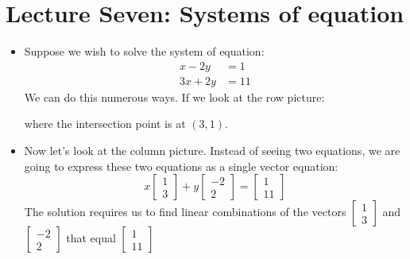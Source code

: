 \section{Lecture Seven: Systems of equation}
\begin{itemize}
    \item Suppose we wish to solve the system of equation:
    \begin{align}
        x-2y&=1 \\ 
        3x+2y &= 11
    \end{align}
    We can do this numerous ways. If we look at the row picture:
    \begin{center}
    \end{center}
    where the intersection point is at $(3,1)$.
    \item Now let's look at the column picture. Instead of seeing two equations, we are going to express these two equations as a single vector equation:
    \begin{equation}
        x\begin{bmatrix}
            1\\3
        \end{bmatrix}
        +y\begin{bmatrix}
        -2\\2
        \end{bmatrix}=\begin{bmatrix}
            1\\11
        \end{bmatrix}
        \label{eq:}
    \end{equation}
    The solution requires us to find linear combinations of the vectors $\begin{bmatrix}
        1\\3
    \end{bmatrix}$ and $\begin{bmatrix}
        -2\\2
    \end{bmatrix}$ that equal $\begin{bmatrix}
        1\\11
    \end{bmatrix}$
    \begin{center}
\end{center}
\end{itemize}
